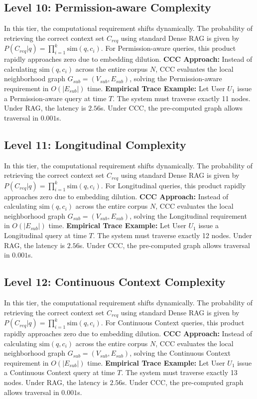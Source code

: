 \subsection{Level 10: Permission-aware Complexity}
In this tier, the computational requirement shifts dynamically. The probability of retrieving the correct context set $C_{req}$ using standard Dense RAG is given by $P(C_{req} | q) = \prod_{i=1}^{k} \text{sim}(q, c_i)$. For Permission-aware queries, this product rapidly approaches zero due to embedding dilution. 
\textbf{CCC Approach:} Instead of calculating $\text{sim}(q, c_i)$ across the entire corpus $N$, CCC evaluates the local neighborhood graph $G_{sub} = (V_{sub}, E_{sub})$, solving the Permission-aware requirement in $O(|E_{sub}|)$ time.
\textbf{Empirical Trace Example:} 
Let User $U_1$ issue a Permission-aware query at time $T$. The system must traverse exactly 11 nodes. Under RAG, the latency is $2.56$s. Under CCC, the pre-computed graph allows traversal in $0.001$s.

\subsection{Level 11: Longitudinal Complexity}
In this tier, the computational requirement shifts dynamically. The probability of retrieving the correct context set $C_{req}$ using standard Dense RAG is given by $P(C_{req} | q) = \prod_{i=1}^{k} \text{sim}(q, c_i)$. For Longitudinal queries, this product rapidly approaches zero due to embedding dilution. 
\textbf{CCC Approach:} Instead of calculating $\text{sim}(q, c_i)$ across the entire corpus $N$, CCC evaluates the local neighborhood graph $G_{sub} = (V_{sub}, E_{sub})$, solving the Longitudinal requirement in $O(|E_{sub}|)$ time.
\textbf{Empirical Trace Example:} 
Let User $U_1$ issue a Longitudinal query at time $T$. The system must traverse exactly 12 nodes. Under RAG, the latency is $2.56$s. Under CCC, the pre-computed graph allows traversal in $0.001$s.

\subsection{Level 12: Continuous Context Complexity}
In this tier, the computational requirement shifts dynamically. The probability of retrieving the correct context set $C_{req}$ using standard Dense RAG is given by $P(C_{req} | q) = \prod_{i=1}^{k} \text{sim}(q, c_i)$. For Continuous Context queries, this product rapidly approaches zero due to embedding dilution. 
\textbf{CCC Approach:} Instead of calculating $\text{sim}(q, c_i)$ across the entire corpus $N$, CCC evaluates the local neighborhood graph $G_{sub} = (V_{sub}, E_{sub})$, solving the Continuous Context requirement in $O(|E_{sub}|)$ time.
\textbf{Empirical Trace Example:} 
Let User $U_1$ issue a Continuous Context query at time $T$. The system must traverse exactly 13 nodes. Under RAG, the latency is $2.56$s. Under CCC, the pre-computed graph allows traversal in $0.001$s.
